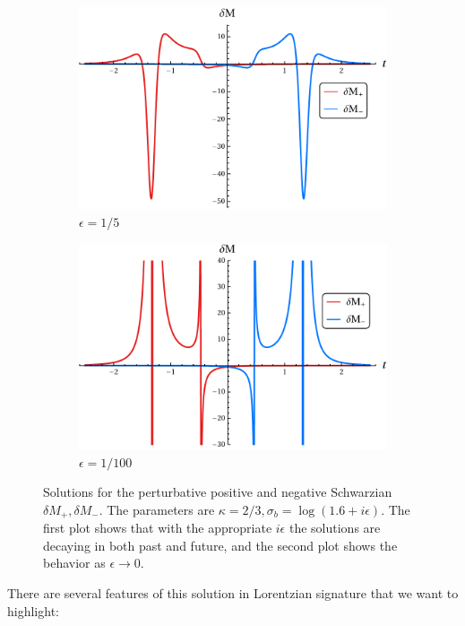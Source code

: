 \documentclass[12pt]{article}
\numberwithin{equation}{section}
\begin{document}
\begin{spacing}{1.1}
\begin{figure}
\centering
\begin{subfigure}{.5\textwidth}
  \centering
  \includegraphics[width=.9\linewidth]{./figures/two-single-largerep.pdf}
  \caption{$\epsilon= 1/5$}
  \label{fig:sub1}
\end{subfigure}%
\begin{subfigure}{.5\textwidth}
  \centering
  \includegraphics[width=.8\linewidth]{./figures/two-single-smallerepv2.pdf}
  \caption{$\epsilon=1/100$}
  \label{fig:sub2}
\end{subfigure}
\caption{Solutions for the perturbative positive and negative Schwarzian $\delta M_+, \delta M_-$. The parameters are $ \kappa = 2/3, \sigma_b= \log(1.6+ i \epsilon)$. The first plot shows that with the appropriate $i\epsilon$ the solutions are decaying in both past and future, and the second plot shows the behavior as $\epsilon \to 0$.
}
\label{singleintervalplot}
\end{figure}



There are several features of this solution in Lorentzian signature that we want to highlight:


\end{spacing}
\end{document}
